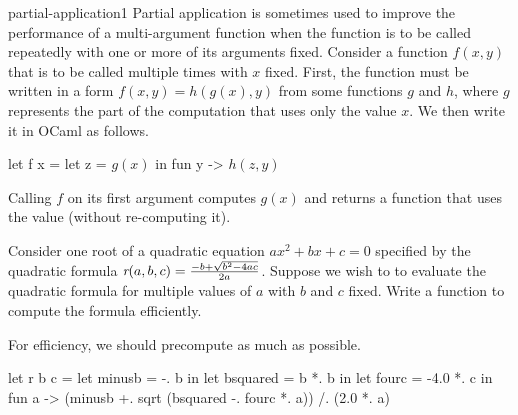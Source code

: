 %
\begin{exercise}{partial-application1}
Partial application is sometimes used to improve the performance of a multi-argument function when
the function is to be called repeatedly with one or more of its arguments fixed.  Consider a
function $f(x, y)$ that is to be called multiple times with $x$ fixed.  First, the function must be
written in a form $f(x, y) = h(g(x), y)$ from some functions $g$ and $h$, where $g$ represents the
part of the computation that uses only the value $x$.  We then write it in OCaml as follows.

\begin{ocaml}
let f x =
   let z = $g(x)$ in
      fun y -> $h(z, y)$
\end{ocaml}
%
Calling $f$ on its first argument computes $g(x)$ and returns a function that uses the value
(without re-computing it).

Consider one root of a quadratic equation $a x^2 + b x + c = 0$ specified by the quadratic formula
$\textit{r}(a, b, c) = {-b + \sqrt{b^2 - 4 a c} \over 2a}$.  Suppose we wish to to evaluate the
quadratic formula for multiple values of $a$ with $b$ and $c$ fixed.  Write a function to compute
the formula efficiently.

\begin{answer}\ifanswers
For efficiency, we should precompute as much as possible.

\begin{ocaml}
let r b c =
   let minusb = -. b in
   let bsquared = b *. b in
   let fourc = -4.0 *. c in
      fun a -> (minusb +. sqrt (bsquared -. fourc *. a)) /. (2.0 *. a)
\end{ocaml}
\fi\end{answer}         
\end{exercise}

